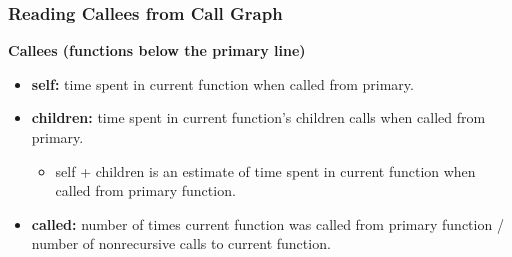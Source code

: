 \documentclass[aspectratio=43]{beamer}
\newenvironment{changemargin}[1]{%
  \begin{list}{}{%
    \setlength{\topsep}{0pt}%
    \setlength{\leftmargin}{#1}%
    \setlength{\rightmargin}{1em}
    \setlength{\listparindent}{\parindent}%
    \setlength{\itemindent}{\parindent}%
    \setlength{\parsep}{\parskip}%
  }%
  \item[]}{\end{list}}
\begin{document}
\begin{frame}[fragile]
  \frametitle{Reading Callees from Call Graph}

  \begin{changemargin}{1cm}
  {\bf Callees (functions below the primary line)}
  \begin{itemize}  
    \item {\bf self:} time spent in current function when called from primary.
    \item {\bf children:} time spent in current function's children calls when
      called from primary.
      \begin{itemize}
        \item self + children is an estimate of time spent in current function
          when called from primary function.
      \end{itemize}
    \item {\bf called:} number of times current function was called from primary
      function / number of nonrecursive calls to current function.
  \end{itemize}
  \end{changemargin}
\end{frame}
\end{document}
